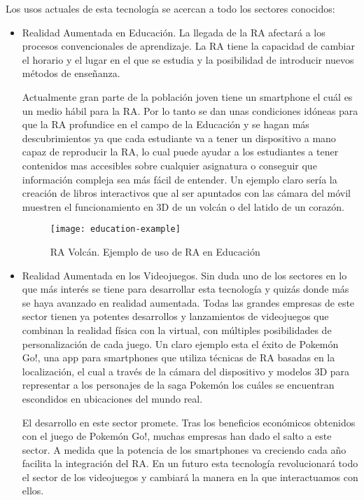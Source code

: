 Los usos actuales de esta tecnología se acercan a todo los sectores conocidos:

\begin{itemize}
	\item Realidad Aumentada en Educación. La llegada de la RA afectará a los procesos convencionales de aprendizaje. La RA tiene la capacidad de cambiar el horario y el lugar en el que se estudia y la posibilidad de introducir nuevos métodos de enseñanza. 
	
	Actualmente gran parte de la población joven tiene un smartphone el cuál es un medio hábil para la RA. Por lo tanto se dan unas condiciones idóneas para que la RA profundice en el campo de la Educación y se hagan más descubrimientos ya que cada estudiante va a tener un dispositivo a mano capaz de reproducir la RA, lo cual puede ayudar a los estudiantes a tener contenidos mas accesibles sobre cualquier asignatura o conseguir que información compleja sea más fácil de entender. Un ejemplo claro sería la creación de libros interactivos que al ser apuntados con las cámara del móvil muestren el funcionamiento en 3D de un volcán o del latido de un corazón.

	\begin{figure}[h]
		\centering
		\texttt{[image: education-example]}
		\caption{RA Volcán. Ejemplo de uso de RA en Educación }
		\label{fig:education-example}
	\end{figure}
	
	\item Realidad Aumentada en los Videojuegos. Sin duda uno de los sectores en lo que más interés se tiene para desarrollar esta tecnología y quizás donde más se haya avanzado en realidad aumentada. Todas las grandes empresas de este sector tienen ya potentes desarrollos y lanzamientos de videojuegos que combinan la realidad física con la virtual, con múltiples posibilidades de personalización de cada juego. Un claro ejemplo esta el éxito de Pokemón Go!\cite{URL::Pokemon-Go}, una app para smartphones que utiliza técnicas de RA basadas en la localización, el cual a través de la cámara del dispositivo y modelos 3D para representar a los personajes de la saga Pokemón\cite{URL::Pokemon} los cuáles se encuentran escondidos en ubicaciones del mundo real.  
	
	El desarrollo en este sector promete. Tras los beneficios económicos obtenidos con el juego de Pokemón Go!, muchas empresas han dado el salto a este sector. A medida que la potencia de los smartphones va creciendo cada año facilita la integración del RA. En un futuro esta tecnología revolucionará todo el sector de los videojuegos y cambiará la manera en la que interactuamos con ellos.   
	

\end{itemize}
